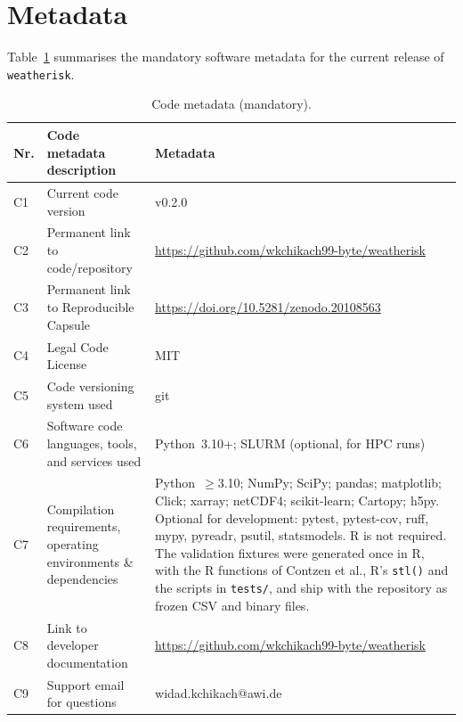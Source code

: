 \documentclass[preprint,12pt,a4paper]{elsarticle}
\newcommand{\revn}[1]{{#1}}
\begin{document}
\section*{Metadata}
\label{sec:metadata}

Table~\ref{tab:metadata} summarises the mandatory software metadata
for the current release of \texttt{weatherisk}.

\begin{table}[!h]
\small
\begin{tabularx}{\textwidth}{|l|>{\raggedright\arraybackslash}p{4.9cm}|>{\raggedright\arraybackslash}X|}
\hline
\textbf{Nr.} & \textbf{Code metadata description} & \textbf{Metadata} \\
\hline
C1 & Current code version & v0.2.0 \\ %
\hline
C2 & Permanent link to code/repository &
  \url{https://github.com/wkchikach99-byte/weatherisk} \\
\hline
C3 & Permanent link to Reproducible Capsule &
  \revn{\url{https://doi.org/10.5281/zenodo.20108563}} \\ %
\hline
C4 & Legal Code License & MIT \\
\hline
C5 & Code versioning system used & git \\
\hline
C6 & Software code languages, tools, and services used &
  Python~3.10+; SLURM (optional, for HPC runs) \\
\hline
C7 & Compilation requirements, operating environments
  \& dependencies &
  Python~$\geq$3.10; NumPy; SciPy; pandas; matplotlib;
  Click; xarray; netCDF4; scikit-learn; Cartopy; h5py.
  Optional for development: pytest, pytest-cov, ruff, mypy, pyreadr,
  psutil, statsmodels. R is not required. The validation fixtures
  were generated once in R, with the R functions of Contzen
  et al., R's \texttt{stl()} and the scripts in
  \texttt{tests/}, and ship with the repository as frozen CSV and
  binary files. \\
\hline
C8 & Link to developer documentation &
  \url{https://github.com/wkchikach99-byte/weatherisk} \\
\hline
C9 & Support email for questions & widad.kchikach@awi.de \\
\hline
\end{tabularx}
\caption{Code metadata (mandatory).}
\label{tab:metadata}
\end{table}
\end{document}
